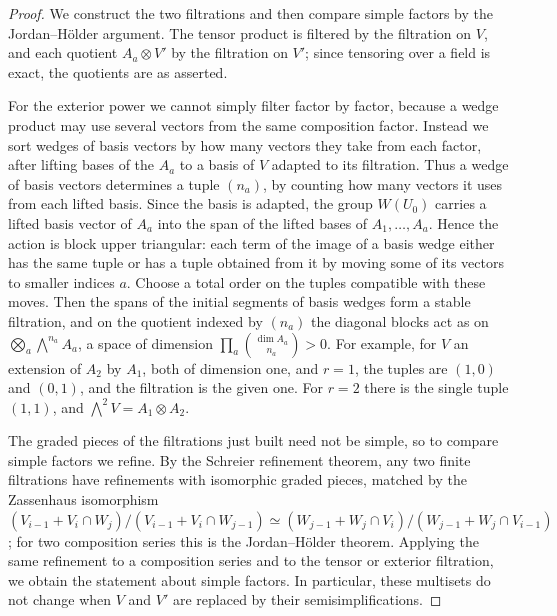\documentclass[11pt]{article}
\begin{document}
\begin{proof}[{Proof}]\label{bp79}%
We construct the two filtrations and then compare simple factors by the Jordan–Hölder argument. The tensor product is filtered by the filtration on \(V\), and each quotient \(A_a\otimes V'\) by the filtration on \(V'\); since tensoring over a field is exact, the quotients are as asserted.

For the exterior power we cannot simply filter factor by factor, because a wedge product may use several vectors from the same composition factor. Instead we sort wedges of basis vectors by how many vectors they take from each factor, after lifting bases of the \(A_a\) to a basis of \(V\) adapted to its filtration. Thus a wedge of basis vectors determines a tuple \((n_a)\), by counting how many vectors it uses from each lifted basis. Since the basis is adapted, the group \(W(U_0)\) carries a lifted basis vector of \(A_a\) into the span of the lifted bases of \(A_1,\ldots,A_a\). Hence the action is block upper triangular: each term of the image of a basis wedge either has the same tuple or has a tuple obtained from it by moving some of its vectors to smaller indices \(a\). Choose a total order on the tuples compatible with these moves. Then the spans of the initial segments of basis wedges form a stable filtration, and on the quotient indexed by \((n_a)\) the diagonal blocks act as on \(\bigotimes_a\bigwedge^{n_a}A_a\), a space of dimension \(\prod_a\binom{\dim A_a}{n_a}>0\). For example, for \(V\) an extension of \(A_2\) by \(A_1\), both of dimension one, and \(r=1\), the tuples are \((1,0)\) and \((0,1)\), and the filtration is the given one. For \(r=2\) there is the single tuple \((1,1)\), and \(\bigwedge^2V=A_1\otimes A_2\).

The graded pieces of the filtrations just built need not be simple, so to compare simple factors we refine. By the Schreier refinement theorem, any two finite filtrations have refinements with isomorphic graded pieces, matched by the Zassenhaus isomorphism \((V_{i-1}+V_i\cap W_j)/(V_{i-1}+V_i\cap W_{j-1})\simeq
(W_{j-1}+W_j\cap V_i)/(W_{j-1}+W_j\cap V_{i-1})\); for two composition series this is the Jordan–Hölder theorem. Applying the same refinement to a composition series and to the tensor or exterior filtration, we obtain the statement about simple factors. In particular, these multisets do not change when \(V\) and \(V'\) are replaced by their semisimplifications.
\end{proof}
\end{document}
